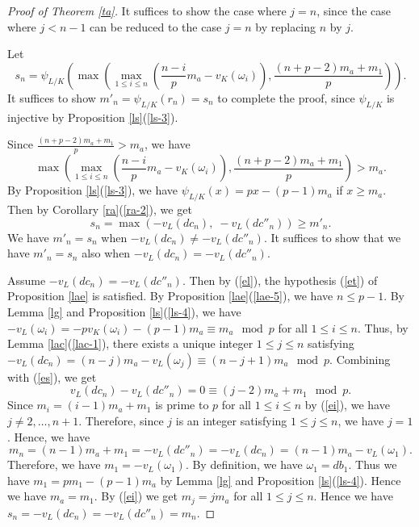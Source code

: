 \documentclass[sn-mathphys-num]{sn-jnl}
\numberwithin{equation}{section}
\theoremstyle{plain}
\theoremstyle{definition}
\begin{document}
\begin{proof}[Proof of Theorem \ref{ta}]
  It suffices to show the case where $j=n$, since the case where $j<n-1$ can be reduced to the case $j=n$ by replacing $n$ by $j$.
  
Let
\begin{equation}
  s_n=\psi_{L/K}\left(\max\left(\max_{1\leq i\leq n}\left(\frac{n-i}{p}m_a-v_K\left(\omega_i\right)\right),\frac{(n+p-2)m_a+m_1}{p}\right)\right).
\end{equation}
It suffices to show $m'_n=\psi_{L/K}(r_n)=s_n$ to complete the proof, since $\psi_{L/K}$ is injective by Proposition \ref{ls}(\ref{ls-3}).

Since $\displaystyle{\frac{(n+p-2)m_a+m_1}{p}>m_a}$, we have
\begin{equation}
\max\left(\max_{1\leq i\leq n}\left(\frac{n-i}{p}m_a-v_K\left(\omega_i\right)\right),\frac{(n+p-2)m_a+m_1}{p}\right)>m_a.
\end{equation}
By Proposition \ref{ls}(\ref{ls-3}), we have $\psi_{L/K}(x)=px-(p-1)m_a$ if $x\geq m_a$. Then by Corollary \ref{ra}(\ref{ra-2}), we get
\begin{equation}
s_n=\max(-v_L(dc_n),\;-v_L(dc''_n))\geq m'_n.
\end{equation}
We have $m'_n=s_n$ when $-v_L(dc_n)\neq -v_L(dc''_n)$. It suffices to show that we have $m'_n=s_n$ also when $-v_L(dc_n)=-v_L(dc''_n)$.

Assume $-v_L(dc_n)=-v_L(dc''_n)$. Then by (\ref{el}), the hypothesis (\ref{et}) of Proposition \ref{lae} is satisfied. By Proposition \ref{lae}(\ref{lae-5}), we have $n\leq p-1$. By Lemma \ref{lg} and Proposition \ref{ls}(\ref{ls-4}), we have $-v_L(\omega_i)=-pv_K(\omega_i)-(p-1)m_a\equiv m_a\mod p$ for all $1\leq i\leq n$. Thus, by Lemma \ref{lac}(\ref{lac-1}), there exists a unique integer $1\leq j\leq n$ satisfying $-v_L(dc_n)=(n-j)m_a-v_L(\omega_j)\equiv (n-j+1)m_a\mod p$. Combining with (\ref{es}), we get
\begin{equation}
v_L(dc_n)-v_L(dc''_n)=0\equiv (j-2)m_a+m_1\mod p.
\end{equation}
Since $m_i=(i-1)m_a+m_1$ is prime to $p$ for all $1\leq i\leq n$ by (\ref{ei}), we have $j\neq 2,\ldots,n+1$. Therefore, since $j$ is an integer satisfying $1\leq j\leq n$, we have $j=1$. Hence, we have
\begin{equation}\label{ew}
m_n=(n-1)m_a+m_1=-v_L(dc''_n)=-v_L(dc_n)=(n-1)m_a-v_L(\omega_1).
\end{equation}
Therefore, we have $m_1=-v_L(\omega_1)$. By definition, we have $\omega_1=db_1$. Thus we have $m_1=pm_1-(p-1)m_a$ by Lemma \ref{lg} and Proposition \ref{ls}(\ref{ls-4}). Hence we have $m_a=m_1$. By (\ref{ei}) we get $m_j=jm_a$ for all $1\leq j\leq n$. Hence we have $s_n=-v_L(dc_n)=-v_L(dc''_n)=m_n$.


\end{proof}
\end{document}
